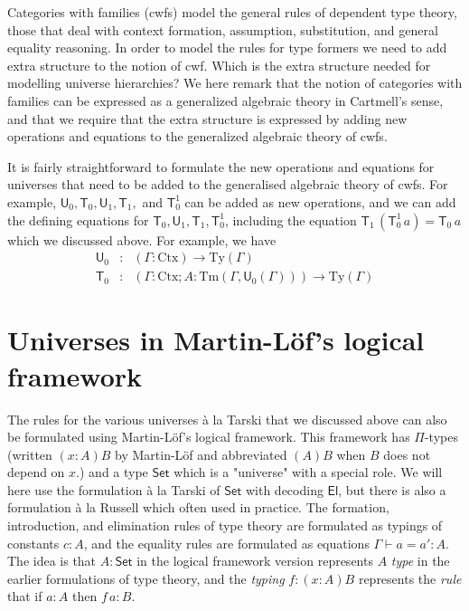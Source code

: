 \documentclass[11pt,a4paper]{article}
\newcommand{\Set}{\mathsf{Set}}
\newcommand{\El}{\mathsf{El}}
\newcommand{\U}{\mathsf{U}}
\newcommand{\T}{\mathsf{T}}
\def\Ctx{\mathrm{Ctx}}
\def\Ty{\mathrm{Ty}}
\def\Tm{\mathrm{Tm}}
\begin{document}
Categories with families (cwfs) model the general rules of dependent type theory, those that deal with context formation, assumption, substitution, and general equality reasoning. In order to model the rules for type formers we need to add extra structure to the notion of cwf. Which is the extra structure needed for modelling universe hierarchies? We here remark that the notion of categories with families can be expressed as a generalized algebraic theory in Cartmell's sense, and that we require that the extra structure is expressed by adding new operations and equations to the generalized algebraic theory of cwfs.

It is fairly straightforward to formulate the new operations and equations for universes that need to be added to the generalised algebraic theory of cwfs. For example, $\U_0,\T_0,\U_1, \T_1,$ and $\T_0^1$ can be added as new operations, and we can add the defining equations for $\T_0,\U_1, \T_1,\T_0^1$, including the equation
$
\T_1\, (\T_0^1\, a) = \T_0\, a
$
which we discussed above. 
For example, we have
\begin{eqnarray*}
\U_0 &: &(\Gamma : \Ctx) \to \Ty(\Gamma)\\
\T_0 &: &(\Gamma : \Ctx ; A : \Tm(\Gamma,\U_0(\Gamma)))\to \Ty(\Gamma)
\end{eqnarray*}

\section{Universes in Martin-Löf's logical framework}

The rules for the various universes \`a la Tarski that we discussed above can also be formulated using Martin-Löf's logical framework. This framework has $\Pi$-types (written $(x : A)B$ by Martin-Löf and abbreviated $(A)B$ when $B$ does not depend on $x$.) and a type $\Set$ which is a "universe" with a special role. We will here use the formulation \`a la Tarski of $\Set$ with decoding $\El$, but there is also a formulation \`a la Russell which often used in practice. The formation, introduction, and elimination rules of type theory are formulated as typings of constants $c : A$, and the equality rules are formulated as equations $\Gamma \vdash a = a' : A$. The idea is that $A : \Set$ in the logical framework version represents $A$ {\em type} in the earlier formulations of type theory, and the {\em typing} $f : (x : A)B$ represents the {\em rule} that if $a : A$ then $f\,a : B$.
\end{document}

